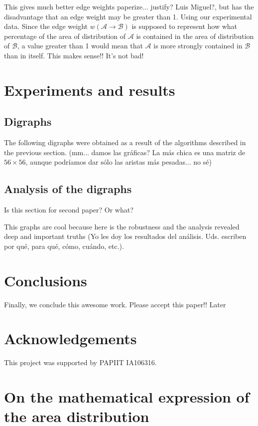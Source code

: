 \documentclass[12pt]{article}
\numberwithin{equation}{section} %
\numberwithin{figure}{section} %
\def\cA{{\mathcal{A}}}
\def\cB{{\mathcal{B}}}
\theoremstyle{definition}
\def\tcr#1{\textcolor{MyRed}{#1}}
\begin{document}
This gives much better edge weights \tcr{paperize... justify? Luis Miguel?}, but has the disadvantage that an edge weight may be greater than 1. Using our experimental data. Since the edge weight $w(\cA \to \cB)$ is supposed to represent how what percentage of the area of distribution of $\cA$ is contained in the area of distribution of $\cB$, a value greater than 1 would mean that $\cA$ is more strongly contained in $\cB$ than in itself. This makes sense!! It's not bad!

\section{Experiments and results}

\subsection{Digraphs}
The following digraphs were obtained as a result of the algorithms described in the previous section. \tcr{(mm... damos las gráficas? La más chica es una matriz de $56\times56$, aunque podríamos dar sólo las aristas más pesadas... no sé)}

\subsection{Analysis of the digraphs}
\tcr{Is this section for second paper? Or what?}

This graphs are cool because here is the robustness and the analysis revealed deep and important truths \tcr{(Yo les doy los resultados del análisis. Uds. escriben por qué, para qué, cómo, cuándo, etc.)}. 

\section{Conclusions}

Finally, we conclude this awesome work. Please accept this paper!! \tcr{Later}


\section*{Acknowledgements}

This project was supported by PAPIIT IA106316.






\appendix
\section{On the mathematical expression of the area distribution}
\end{document}
